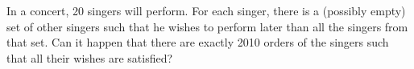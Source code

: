 In a concert, 20 singers will perform. For each singer, there is a (possibly empty) set of other singers such that he wishes to perform later than all the singers from that set. Can it happen that there are exactly 2010 orders of the singers such that all their wishes are satisfied?
